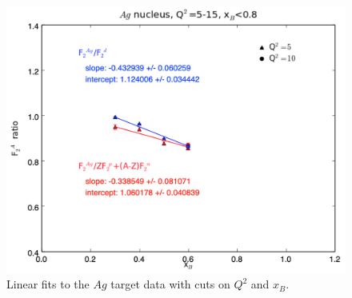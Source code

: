 \documentclass[oneside]{article}
\begin{document}
\begin{figure}[H]
\begin{minipage}{0.5\textwidth}
\includegraphics[width=\textwidth]{plots/q2_all_x_all/all_Ag.png}
\end{minipage}
  \caption[]{Linear fits to the $Ag$ target data with cuts on $Q^2$ and $x_B$.}
  \label{fig:fits_Ag}
\end{figure}   
 
\end{document}
